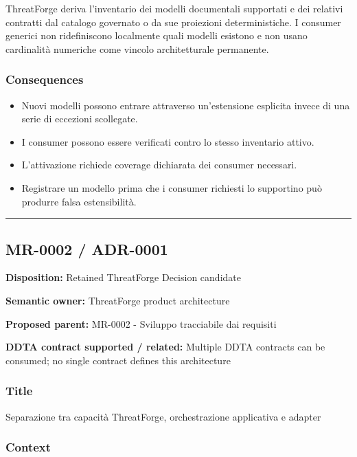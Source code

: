 \documentclass[
  10pt,
  a4paper,
]{article}
\providecommand{\tightlist}{%
  \setlength{\itemsep}{0pt}\setlength{\parskip}{0pt}}
\begin{document}
ThreatForge deriva l'inventario dei modelli documentali supportati e dei
relativi contratti dal catalogo governato o da sue proiezioni
deterministiche. I consumer generici non ridefiniscono localmente quali
modelli esistono e non usano cardinalità numeriche come vincolo
architetturale permanente.

\subsubsection{Consequences}\label{consequences-7}

\begin{itemize}
\tightlist
\item
  Nuovi modelli possono entrare attraverso un'estensione esplicita
  invece di una serie di eccezioni scollegate.
\item
  I consumer possono essere verificati contro lo stesso inventario
  attivo.
\item
  L'attivazione richiede coverage dichiarata dei consumer necessari.
\item
  Registrare un modello prima che i consumer richiesti lo supportino può
  produrre falsa estensibilità.
\end{itemize}

\begin{center}\rule{0.5\linewidth}{0.5pt}\end{center}

\subsection{MR-0002 / ADR-0001}\label{mr-0002-adr-0001}

\textbf{Disposition:} Retained ThreatForge Decision candidate

\textbf{Semantic owner:} ThreatForge product architecture

\textbf{Proposed parent:} MR-0002 - Sviluppo tracciabile dai requisiti

\textbf{DDTA contract supported / related:} Multiple DDTA contracts can
be consumed; no single contract defines this architecture

\subsubsection{Title}\label{title-8}

Separazione tra capacità ThreatForge, orchestrazione applicativa e
adapter

\subsubsection{Context}\label{context-8}
\end{document}
